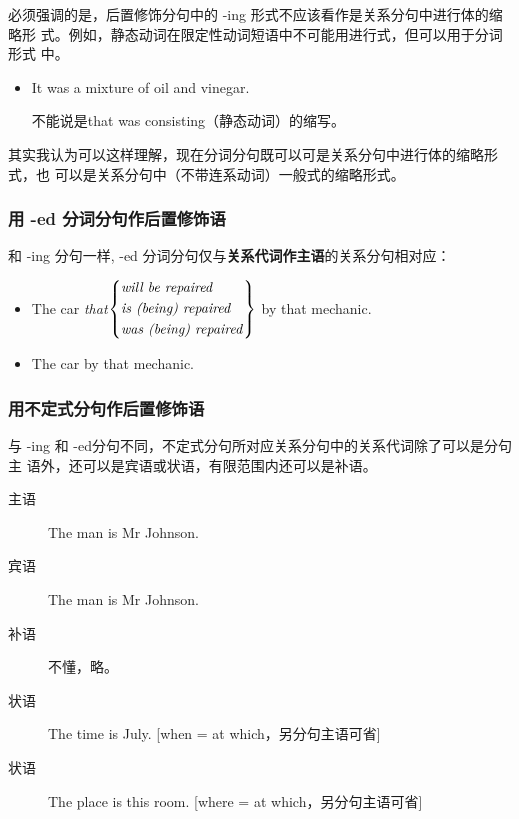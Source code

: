 必须强调的是，后置修饰分句中的 -ing 形式不应该看作是关系分句中进行体的缩略形
式。例如，静态动词在限定性动词短语中不可能用进行式，但可以用于分词形式
中。
\begin{itemize}
\item It was a mixture  of oil and vinegar.

  不能说是that was consisting（静态动词）的缩写。
\end{itemize}
其实我认为可以这样理解，现在分词分句既可以可是关系分句中进行体的缩略形式，也
可以是关系分句中（不带连系动词）一般式的缩略形式。


\subsubsection{用 -ed 分词分句作后置修饰语}

和 -ing 分句一样, -ed 分词分句仅与\textbf{关系代词作主语}的关系分句相对应：
\begin{itemize}
\item The car \emph{that}$\left\{
    \begin{aligned}
      &\text{\emph{will be repaired}} \\
      &\text{\emph{is (being) repaired}} \\
      &\text{\emph{was (being) repaired}} \\
    \end{aligned}
  \right\} $ by that mechanic.

\item The car   by that mechanic.
\end{itemize}

\subsubsection{用不定式分句作后置修饰语}

与 -ing 和 -ed分句不同，不定式分句所对应关系分句中的关系代词除了可以是分句主
语外，还可以是宾语或状语，有限范围内还可以是补语。
\begin{description}
\item[主语] The man  is Mr Johnson.

\item[宾语] The man  is Mr Johnson.

\item[补语] 不懂，略。

\item[状语] The time  is July.
  [when = at which，另分句主语可省]

\item[状语] The place  is
  this room.  [where = at which，另分句主语可省]
\end{description}

